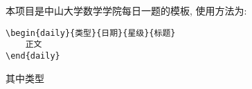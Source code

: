 \documentclass{daily}
\begin{document}
本项目是中山大学数学学院每日一题的模板, 使用方法为:
\begin{lstlisting}
\begin{daily}{类型}{日期}{星级}{标题}
	正文
\end{daily}
\end{lstlisting}
其中类型
\end{document}
